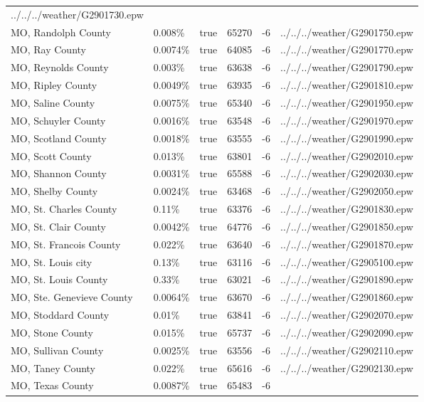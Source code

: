 \begin{longtable}[]{@{}llllll@{}}
../../../weather/G2901730.epw \\
MO, Randolph County & 0.008\% & true & 65270 & -6 &
../../../weather/G2901750.epw \\
MO, Ray County & 0.0074\% & true & 64085 & -6 &
../../../weather/G2901770.epw \\
MO, Reynolds County & 0.003\% & true & 63638 & -6 &
../../../weather/G2901790.epw \\
MO, Ripley County & 0.0049\% & true & 63935 & -6 &
../../../weather/G2901810.epw \\
MO, Saline County & 0.0075\% & true & 65340 & -6 &
../../../weather/G2901950.epw \\
MO, Schuyler County & 0.0016\% & true & 63548 & -6 &
../../../weather/G2901970.epw \\
MO, Scotland County & 0.0018\% & true & 63555 & -6 &
../../../weather/G2901990.epw \\
MO, Scott County & 0.013\% & true & 63801 & -6 &
../../../weather/G2902010.epw \\
MO, Shannon County & 0.0031\% & true & 65588 & -6 &
../../../weather/G2902030.epw \\
MO, Shelby County & 0.0024\% & true & 63468 & -6 &
../../../weather/G2902050.epw \\
MO, St. Charles County & 0.11\% & true & 63376 & -6 &
../../../weather/G2901830.epw \\
MO, St. Clair County & 0.0042\% & true & 64776 & -6 &
../../../weather/G2901850.epw \\
MO, St. Francois County & 0.022\% & true & 63640 & -6 &
../../../weather/G2901870.epw \\
MO, St. Louis city & 0.13\% & true & 63116 & -6 &
../../../weather/G2905100.epw \\
MO, St. Louis County & 0.33\% & true & 63021 & -6 &
../../../weather/G2901890.epw \\
MO, Ste. Genevieve County & 0.0064\% & true & 63670 & -6 &
../../../weather/G2901860.epw \\
MO, Stoddard County & 0.01\% & true & 63841 & -6 &
../../../weather/G2902070.epw \\
MO, Stone County & 0.015\% & true & 65737 & -6 &
../../../weather/G2902090.epw \\
MO, Sullivan County & 0.0025\% & true & 63556 & -6 &
../../../weather/G2902110.epw \\
MO, Taney County & 0.022\% & true & 65616 & -6 &
../../../weather/G2902130.epw \\
MO, Texas County & 0.0087\% & true & 65483 & -6 &

\end{longtable}
